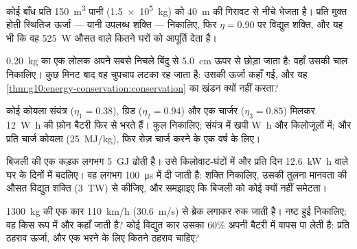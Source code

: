 \begin{exercise}[$\star\star$]\label{exo:g10:energy-conservation:10}
कोई बाँध प्रति  \qty{150}{m^3} पानी (\qty{1.5e5}{kg}) को \qty{40}{m} की गिरावट से
नीचे भेजता है। प्रति  मुक्त होती स्थितिज ऊर्जा --- यानी
उपलब्ध शक्ति --- निकालिए, फिर $\eta = 0.90$ पर विद्युत
शक्ति, और यह भी कि वह \qty{525}{W} औसत वाले कितने घरों को आपूर्ति
देता है।
\end{exercise}

\begin{exercise}[$\star\star$]\label{exo:g10:energy-conservation:11}
\qty{0.20}{kg} का एक लोलक अपने सबसे निचले बिंदु से \qty{5.0}{cm} ऊपर से छोड़ा जाता
है: वहाँ उसकी चाल निकालिए। कुछ मिनट बाद वह चुपचाप लटका रह जाता है: उसकी
ऊर्जा कहाँ गई, और यह \cref{thm:g10:energy-conservation:conservation} का खंडन क्यों नहीं करता?
\end{exercise}

\begin{exercise}[$\star\star\star$]\label{exo:g10:energy-conservation:12}
कोई कोयला संयंत्र ($\eta_1 = 0.38$), ग्रिड ($\eta_2 = 0.94$) और एक चार्जर ($\eta_3 = 0.85$)
मिलकर \qty{12}{W.h} की फ़ोन बैटरी फिर से भरते हैं। कुल 
निकालिए; संयंत्र में खपी  \unit{W.h} और किलोजूलों
में; और प्रति चार्ज कोयला (\qty{25}{MJ/kg}), फिर रोज़ चार्ज करने के एक वर्ष के
लिए।
\end{exercise}

\begin{exercise}[$\star\star\star$]\label{exo:g10:energy-conservation:13}
बिजली की एक कड़क लगभग \qty{5}{GJ} ढोती है। उसे किलोवाट-घंटों में
और प्रति दिन \qty{12.6}{kW.h} वाले घर के दिनों में बदलिए। वह लगभग \qty{100}{\micro s} में दी
जाती है: शक्ति निकालिए, उसकी तुलना मानवता की औसत विद्युत
शक्ति (\qty{3}{TW}) से कीजिए, और समझाइए कि बिजली को कोई क्यों नहीं
समेटता।
\end{exercise}

\begin{exercise}[$\star\star\star$]\label{exo:g10:energy-conservation:14}
\qty{1300}{kg} की एक कार \qty{110}{km/h} (\qty{30.6}{m/s}) से ब्रेक लगाकर रुक जाती है। नष्ट
हुई  निकालिए; वह किस रूप में और कहाँ जाती है? कोई
विद्युत कार उसका $60\%$ अपनी बैटरी में वापस पा लेती है: प्रति ठहराव
ऊर्जा, और एक  भरने के लिए कितने ठहराव
चाहिए?
\end{exercise}

